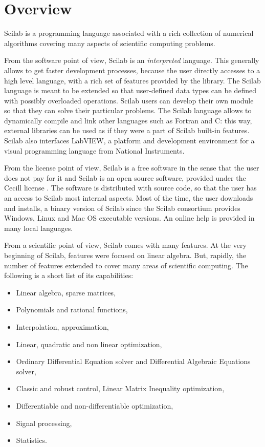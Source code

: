 %

\section{Overview}

Scilab is a programming language associated with a rich collection
of numerical algorithms covering many aspects of scientific computing 
problems. 

From the software point of view, Scilab is an \emph{interpreted} language.
This generally allows to get faster development processes, because the user
directly accesses to a high level language, with a rich set of 
features provided by the library.
The Scilab language is meant to be extended so that user-defined data types
can be defined with possibly overloaded operations.
Scilab users can develop their own module so that they can 
solve their particular problems.
The Scilab language allows to dynamically compile and link other languages such 
as Fortran and C: this way, external libraries can be used as if they were 
a part of Scilab built-in features. Scilab also interfaces LabVIEW, 
a platform and development environment for a visual programming language 
from National Instruments.

From the license point of view, Scilab is a free software in the sense that the user does not 
pay for it and Scilab is an open source software, provided under the Cecill
license \cite{CecillLicence}. The software is distributed with source code, so that the user
has an access to Scilab most internal aspects. Most of the time, 
the user downloads and installs, a binary version of Scilab since the Scilab consortium  
provides Windows, Linux and Mac OS executable versions. An online help is provided 
in many local languages.

From a scientific point of view, Scilab comes with many features. 
At the very beginning of Scilab, features were focused on linear algebra.
But, rapidly, the number of features extended to cover many areas of 
scientific computing. 
The following is a short list of its capabilities:
    \begin{itemize}
    \item Linear algebra, sparse matrices,
    \item Polynomials and rational functions,
    \item Interpolation, approximation,
    \item Linear, quadratic and non linear optimization,
    \item Ordinary Differential Equation solver and Differential Algebraic Equations solver,
    \item Classic and robust control, Linear Matrix Inequality optimization,
    \item Differentiable and non-differentiable optimization,
    \item Signal processing,
    \item Statistics.
    \end{itemize}

